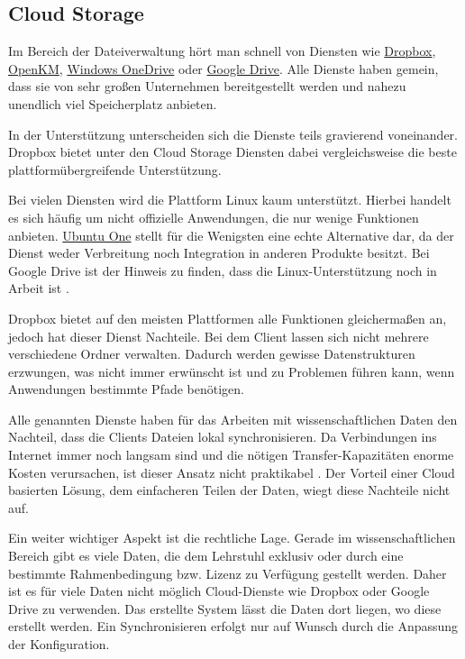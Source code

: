 \documentclass[oneside, ngerman, toc=bibliography,bibliography=totoc,listof=entryprefix, open=right,numbers=noenddot,fontsize=12pt]{scrbook}
\begin{document}
\subsection{Cloud Storage}
Im Bereich der Dateiverwaltung hört man schnell von Diensten wie \href{https://www.dropbox.com/de/}{{Dropbox}}, \href{http://www.openkm.com/en/}{{OpenKM}},
\href{https://onedrive.live.com/}{{Windows OneDrive}} oder  \href{https://www.google.com/intl/de_de/drive/}{{Google Drive}}.
Alle Dienste haben gemein, dass sie von sehr großen Unternehmen bereitgestellt werden und nahezu unendlich viel Speicherplatz anbieten. 

In der Unterstützung unterscheiden sich die Dienste teils gravierend voneinander. {Dropbox} bietet unter den Cloud Storage Diensten dabei vergleichsweise die beste plattformübergreifende Unterstützung.

Bei vielen Diensten wird die Plattform Linux kaum unterstützt. Hierbei handelt es sich häufig um nicht offizielle Anwendungen, die nur wenige Funktionen anbieten. \href{https://one.ubuntu.com/}{Ubuntu One} stellt für die Wenigsten eine echte Alternative dar, da der Dienst weder Verbreitung noch Integration in anderen Produkte besitzt. Bei {Google Drive} ist der Hinweis zu finden, dass die Linux-Unterstützung noch in Arbeit ist \cite{googledrive}.

{Dropbox} bietet auf den meisten Plattformen alle Funktionen gleichermaßen an, jedoch hat dieser Dienst Nachteile.
Bei dem Client lassen sich nicht mehrere verschiedene Ordner verwalten. Dadurch werden gewisse Datenstrukturen erzwungen, was nicht immer erwünscht ist und zu Problemen führen kann, wenn Anwendungen bestimmte Pfade benötigen.

Alle genannten Dienste haben für das Arbeiten mit wissenschaftlichen Daten den Nachteil, dass die Clients Dateien lokal synchronisieren. Da Verbindungen ins Internet immer noch langsam sind und die nötigen Transfer-Kapazitäten enorme Kosten verursachen, ist dieser Ansatz nicht praktikabel \cite{telekomlahr}. Der Vorteil einer Cloud basierten Lösung, dem einfacheren Teilen der Daten, wiegt diese Nachteile nicht auf.

Ein weiter wichtiger Aspekt ist die rechtliche Lage. Gerade im wissenschaftlichen Bereich gibt es viele Daten, die dem Lehrstuhl exklusiv oder durch eine bestimmte Rahmenbedingung bzw. Lizenz zu Verfügung gestellt werden. 
Daher ist es für viele Daten nicht möglich Cloud-Dienste wie Dropbox oder Google Drive zu verwenden. 
Das erstellte System lässt die Daten dort liegen, wo diese erstellt werden. Ein Synchronisieren erfolgt nur auf Wunsch durch die Anpassung der Konfiguration.
\end{document}
